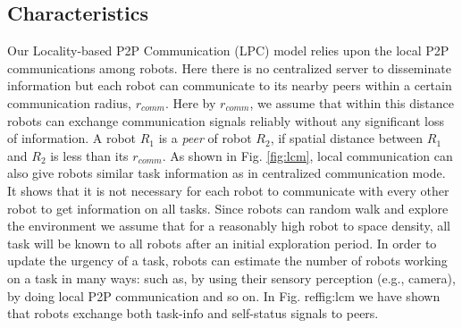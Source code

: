 \documentclass[letterpaper, 10 pt, conference]{ieeeconf}  %
\begin{document}
\subsection{Characteristics}
Our Locality-based P2P Communication (LPC) model relies upon the local P2P communications among robots. Here there is no centralized server to disseminate information but each robot can communicate to its nearby peers within a certain communication radius, $r_{comm}$. Here by $r_{comm}$, we assume that within this distance robots can exchange communication signals reliably without any significant loss of information. A robot $R_1$ is a {\em peer} of robot $R_2$, if spatial distance between $R_1$ and $R_2$ is less than its $r_{comm}$. As shown in Fig. \ref{fig:lcm}, local communication can also give robots similar task information as in centralized communication mode. It shows that it is not necessary for each robot to communicate with every other robot to get information on all tasks. Since robots can random walk and explore the environment we assume that for a reasonably high robot to space density, all task will be known to all robots after an initial exploration period. In order to update the urgency of a task, robots can estimate the number of robots working on a task in many ways: such as,  by using their sensory perception (e.g., camera), by doing local P2P communication and so on. In Fig. ref{fig:lcm} we have shown that robots exchange both task-info and self-status signals to peers.\\
\end{document}
